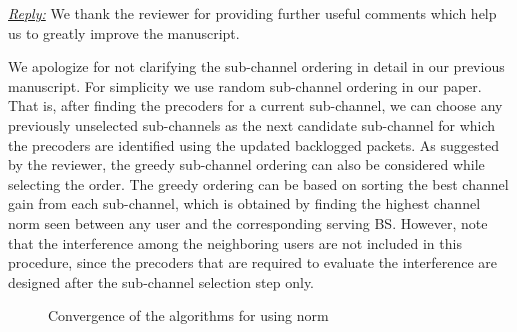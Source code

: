 
\vspace{1eM}
\underline{\textit{Reply:}} We thank the reviewer for providing further useful comments which help us to greatly improve the manuscript.

\begin{enumerate}
	
 

\resp We apologize for not clarifying the sub-channel ordering in detail in our previous manuscript. For simplicity we use random sub-channel ordering in our paper. That is, after finding the precoders for a current sub-channel, we can choose any previously unselected sub-channels as the next candidate sub-channel for which the precoders are identified using the updated backlogged packets. As suggested by the reviewer, the greedy sub-channel ordering can also be considered while selecting the order. The greedy ordering can be based on sorting the best channel gain from each sub-channel, which is obtained by finding the highest channel norm seen between any user and the corresponding serving \ac{BS}. However, note that the interference among the neighboring users are not included in this procedure, since the precoders that are required to evaluate the interference are designed after the sub-channel selection step only.
\begin{figure*}[h!]
	\centering
	\hfill
	\caption{Convergence of the algorithms for  using  norm}
	\label{fig-review-1}
\end{figure*}


\end{enumerate}
